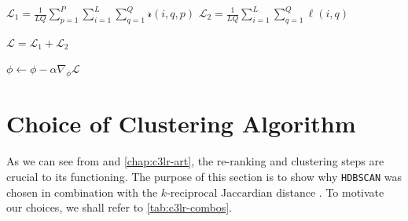 \begin{algorithm}[ht]
{        \vspace{+0.15cm}
        $\mathcal{L}_{1}=\frac{1}{L Q} \sum_{p=1}^{P} \sum_{i=1}^{L} \sum_{q=1}^{Q} \mathscr{r}(i, q, p)$\;
        $\mathcal{L}_{2}=\frac{1}{L Q} \sum_{i=1}^{L} \sum_{q=1}^{Q} \ell(i, q)$\;
        
        $\mathcal{L} = \mathcal{L}_{1} + \mathcal{L}_{2}$
        
        $\phi \gets \phi-\alpha \nabla_{\phi} \mathcal{L}$\;
    }
\end{algorithm}


\section{Choice of Clustering Algorithm}\label{sec:c3lr-clustering-algo}

As we can see from  and \cref{chap:c3lr-art}, the re-ranking and clustering steps are crucial to its functioning. The purpose of this section is to show why \texttt{HDBSCAN} \parencite{McInnes2017Hdbscan:Clustering} was chosen in combination with the $k$-reciprocal Jaccardian distance \parencite{ZhongRe-rankingEncoding}. To motivate our choices, we shall refer to \cref{tab:c3lr-combos}.

